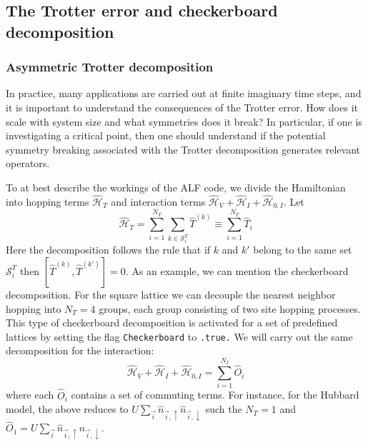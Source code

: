 %



\subsection{The Trotter error and  checkerboard  decomposition }\label{sec:trotter}
%

\subsubsection{ Asymmetric  Trotter decomposition }
In practice, many applications are carried out at finite  imaginary time steps,  and it is important to  understand the consequences of the Trotter error.
How does it scale with system size and  what  symmetries  does it break?
In particular, if  one is investigating a critical  point, then one should understand  if the potential symmetry breaking  associated  with the Trotter decomposition   generates  relevant operators.

To at best describe the workings of the ALF  code,  we divide the Hamiltonian into  hopping terms  $\hat{\mathcal{H}}_{T}$  and interaction terms  
$\hat{\mathcal{H}}_{V} +  \hat{\mathcal{H}}_{I}   +   \hat{\mathcal{H}}_{0,I} $.       Let 
\begin{equation}
\label{Checkerboard.Eq}
	\hat{\mathcal{H}}_{T}     = \sum_{i=1}^{N_T} \sum_{k \in \mathcal{S}^{T}_i} \hat{T}^{(k)}  \equiv \sum_{i=1}^{N_T} \hat{T}_{i}
\end{equation}
Here the decomposition follows the rule  that if $k$ and $k'$  belong to the same set $\mathcal{S}^{T}_i $ then   $ \left[ \hat{T}^{(k)} , \hat{T}^{(k')} \right] = 0 $.  As an 
example, we can mention the checkerboard decomposition.
For the square lattice we can decouple the nearest neighbor hopping  into $N_T=4$ groups,  each group consisting of two site hopping processes.
This type of checkerboard decomposition is activated for a set  of predefined lattices by setting the flag  \texttt{Checkerboard} to \texttt{.true.}
We will carry out the same decomposition for the interaction: 
\begin{equation}
	\hat{\mathcal{H}}_{V}  +  \hat{\mathcal{H}}_{I}   +   \hat{\mathcal{H}}_{0,I}   = \sum_{i=1}^{N_I}  \hat{O}_{i}
\end{equation}
where each $\hat{O}_{i}$  contains a set of commuting terms.  For instance, for the Hubbard model,   the  above reduces to 
$U \sum_{\vec{i}}  \hat{n}_{\vec{i},\uparrow } \hat{n}_{\vec{i},\downarrow }  $    such the $N_T = 1$ and   $ \hat{O}_{1} = U \sum_{\vec{i}}  \hat{n}_{\vec{i},\uparrow } \hat{n}_{\vec{i},\downarrow }   $. 

